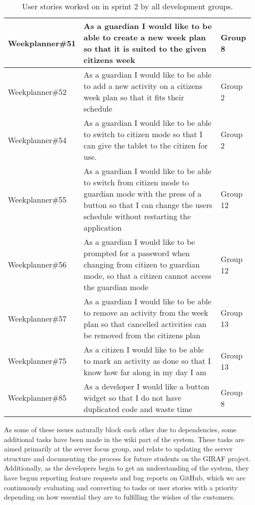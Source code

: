 \begin{table}[H]
\begin{tabular}{|p{2.8cm}|p{7cm}|p{2cm}|}
    Weekplanner\#51 & As a guardian I would like to be able to create a new week plan so that it is suited to the given citizens week                                                                          & Group 8             \\ \hline
    Weekplanner\#52 & As a guardian I would like to be able to add a new activity on a citizens week plan so that it fits their schedule                                                                       & Group 2             \\ \hline
    Weekplanner\#54 & As a guardian I would like to be able to switch to citizen mode so that I can give the tablet to the citizen for use.                                                                    & Group 2             \\ \hline
    Weekplanner\#55 & As a guardian I would like to be able to switch from citizen mode to guardian mode with the press of a button so that I can change the users schedule without restarting the application & Group 12            \\ \hline
    Weekplanner\#56 & As a guardian I would like to be prompted for a password when changing from citizen to guardian mode, so that a citizen cannot access the guardian mode                                  & Group 12            \\ \hline
    Weekplanner\#57 & As a guardian I would like to be able to remove an activity from the week plan so that cancelled activities can be removed from the citizens plan                                        & Group 13            \\ \hline
    Weekplanner\#75 & As a citizen I would like to be able to mark an activity as done so that I know how far along in my day I am                                                                             & Group 13            \\ \hline
    Weekplanner\#85 & As a developer I would like a button widget so that I do not have duplicated code and waste time                                                                                         & Group 8             \\ \hline
    \end{tabular}
    \caption{User stories worked on in sprint 2 by all development groups.}\label{table:user-stories-sprint-2}
\end{table}

\noindent 
As some of these issues naturally block each other due to dependencies, some additional tasks have been made in the wiki part of the system. 
These tasks are aimed primarily at the server focus group, and relate to updating the server structure and documenting the process for future students on the GIRAF project.
Additionally, as the developers begin to get an understanding of the system, they have begun reporting feature requests and bug reports on GitHub, which we are continuously evaluating and converting to tasks or user stories with a priority depending on how essential they are to fulfilling the wishes of the customers.
